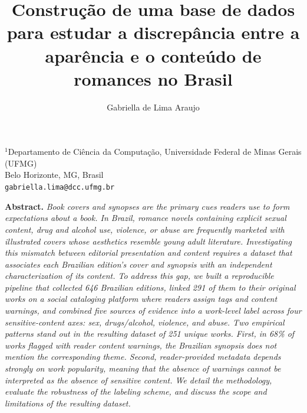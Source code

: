 \documentclass[12pt]{article}
\title{\textbf{Construção de uma base de dados para estudar a discrepância entre a aparência e o conteúdo de romances no Brasil}}
\author{Gabriella de Lima Araujo\inst{1}}
\date{}
\renewenvironment{abstract}{\centering\begin{minipage}{14.4cm}\small\textbf{Abstract. }\itshape}{\end{minipage}\par\vspace{10pt}}
\begin{document}
\maketitle
\begin{center}
\vspace{-0.8cm}
{\small
$^1$Departamento de Ciência da Computação, Universidade Federal de Minas Gerais (UFMG)\\
Belo Horizonte, MG, Brasil\\[3pt]
\texttt{gabriella.lima@dcc.ufmg.br}
}
\vspace{0.5cm}
\end{center}

\begin{abstract}
Book covers and synopses are the primary cues readers use to form expectations about a book. In Brazil, romance novels containing explicit sexual content, drug and alcohol use, violence, or abuse are frequently marketed with illustrated covers whose aesthetics resemble young adult literature. Investigating this mismatch between editorial presentation and content requires a dataset that associates each Brazilian edition's cover and synopsis with an \emph{independent} characterization of its content. To address this gap, we built a reproducible pipeline that collected 646 Brazilian editions, linked 291 of them to their original works on a social cataloging platform where readers assign tags and content warnings, and combined five sources of evidence into a work-level label across four sensitive-content axes: sex, drugs/alcohol, violence, and abuse. Two empirical patterns stand out in the resulting dataset of 251 unique works. First, in 68\% of works flagged with reader content warnings, the Brazilian synopsis does not mention the corresponding theme. Second, reader-provided metadata depends strongly on work popularity, meaning that the absence of warnings cannot be interpreted as the absence of sensitive content. We detail the methodology, evaluate the robustness of the labeling scheme, and discuss the scope and limitations of the resulting dataset.
\end{abstract}
\end{document}
